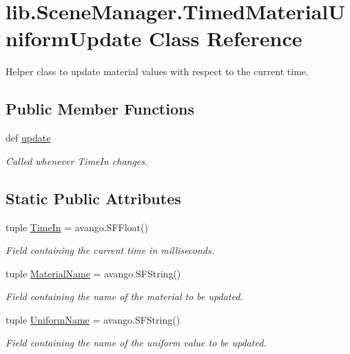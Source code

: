 \hypertarget{classlib_1_1SceneManager_1_1TimedMaterialUniformUpdate}{\section{lib.\-Scene\-Manager.\-Timed\-Material\-Uniform\-Update \-Class \-Reference}
\label{classlib_1_1SceneManager_1_1TimedMaterialUniformUpdate}
}


\-Helper class to update material values with respect to the current time.  


\subsection*{\-Public \-Member \-Functions}
\begin{DoxyCompactItemize}
\item 
def \hyperlink{classlib_1_1SceneManager_1_1TimedMaterialUniformUpdate_a3939df1995c3e752b2da5c0383c77563}{update}
\begin{DoxyCompactList}\small\item\em \-Called whenever \-Time\-In changes. \end{DoxyCompactList}\end{DoxyCompactItemize}
\subsection*{\-Static \-Public \-Attributes}
\begin{DoxyCompactItemize}
\item 
tuple \hyperlink{classlib_1_1SceneManager_1_1TimedMaterialUniformUpdate_afb8c37beb5d86517c21c2d700e47c95b}{\-Time\-In} = avango.\-S\-F\-Float()
\begin{DoxyCompactList}\small\item\em \-Field containing the current time in milliseconds. \end{DoxyCompactList}\item 
tuple \hyperlink{classlib_1_1SceneManager_1_1TimedMaterialUniformUpdate_a01ff1b7885515d0d6adbc0c6edc6f22c}{\-Material\-Name} = avango.\-S\-F\-String()
\begin{DoxyCompactList}\small\item\em \-Field containing the name of the material to be updated. \end{DoxyCompactList}\item 
tuple \hyperlink{classlib_1_1SceneManager_1_1TimedMaterialUniformUpdate_a3717471a964704994e751a613a7de1e3}{\-Uniform\-Name} = avango.\-S\-F\-String()
\begin{DoxyCompactList}\small\item\em \-Field containing the name of the uniform value to be updated. \end{DoxyCompactList}\end{DoxyCompactItemize}


